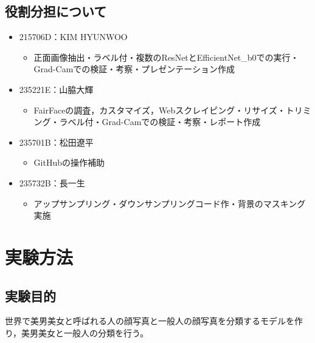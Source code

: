 \documentclass[a4paper,11pt,titlepage]{jsarticle}
\begin{document}
\subsection{役割分担について}
\begin{itemize}
    \item 215706D：KIM HYUNWOO
        \begin{itemize}
            \item 正面画像抽出・ラベル付・複数のResNetとEfficientNet\_b0での実行・Grad-Camでの検証・考察・プレゼンテーション作成
        \end{itemize}
    \item 235221E：山脇大輝
        \begin{itemize}
            \item FairFaceの調査，カスタマイズ，Webスクレイピング・リサイズ・トリミング・ラベル付・Grad-Camでの検証・考察・レポート作成
        \end{itemize}
    \item 235701B：松田遼平
        \begin{itemize}
            \item GitHubの操作補助
        \end{itemize}
    \item 235732B：長一生
        \begin{itemize}
            \item アップサンプリング・ダウンサンプリングコード作・背景のマスキング実施
        \end{itemize}
\end{itemize}



\section{実験方法}
\label{label:実験方法}
\subsection{実験目的}
世界で美男美女と呼ばれる人の顔写真と一般人の顔写真を分類するモデルを作り，美男美女と一般人の分類を行う。
\end{document}
